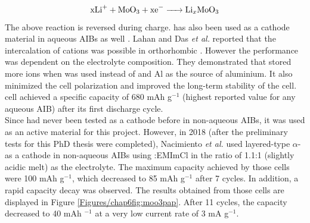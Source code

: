 \begin{equation} \label{moeq}
    \ce{xLi+ + MoO3 + xe- -> Li_{x}MoO3} 
\end{equation}
The above reaction is reversed during charge.  has also been used as a cathode material in aqueous AIBs as well \cite{joseph_hexagonal_2019, shakir_structural_2010, lahan_al3+_2019, lahan_active_2018}. Lahan and Das \textit{et al.} reported that the intercalation of  cations was possible in orthorhombic . However the performance was dependent on the electrolyte composition. They demonstrated that  stored more  ions when  was used instead of  and Al as the source of aluminium. It also minimized the cell polarization and improved the long-term stability of the cell.  cell achieved a specific capacity of 680 mAh g$^{-1}$ (highest reported value for any aqueous AIB) after its first discharge cycle. \\ 
Since  had never been tested as a cathode before in non-aqueous AIBs, it was used as an active material for this project. However, in 2018 (after the preliminary tests for this PhD thesis were completed), Nacimiento \textit{et al.} used layered-type $\alpha$- as a cathode in non-aqueous AIBs using :EMImCl in the ratio of 1.1:1 (slightly acidic melt) as the electrolyte. The maximum capacity achieved by those cells were 100 mAh g$^{-1}$, which decreased to 85 mAh g$^{-1}$ after 7 cycles. In addition, a rapid capacity decay was observed. The results obtained from those cells are displayed in Figure \ref{Figures/chap6fig:moo3pap}. After 11 cycles, the capacity decreased to 40 mAh $^{-1}$ at a very low current rate of 3 mA g$^{-1}$. 

